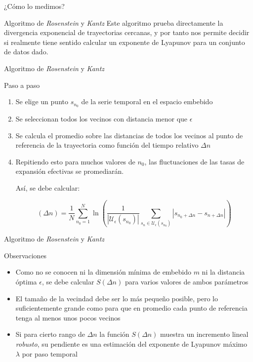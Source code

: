 \documentclass[11pt]{beamer}
\begin{document}
\begin{frame}{¿Cómo lo medimos?}
	\begin{block}{Algoritmo de \textit{Rosenstein} y \textit{Kantz}}
		Este algoritmo prueba directamente la divergencia exponencial de trayectorias cercanas, y por tanto nos permite decidir si realmente tiene sentido calcular un exponente de Lyapunov para un conjunto de datos dado.
	\end{block}
\end{frame}

\begin{frame}{Algoritmo de \textit{Rosenstein} y \textit{Kantz}}
	\small
	\begin{block}{Paso a paso}
		\begin{enumerate}
			\item Se elige un punto $s_{n_0}$ de la serie temporal en el espacio embebido 
			\item Se seleccionan todos los vecinos con distancia menor que $\epsilon$
			\item Se calcula el promedio sobre las distancias de todos los vecinos al punto de referencia de la trayectoria como función del tiempo relativo $\Delta n$
			\item Repitiendo esto para muchos valores de $n_0$, las fluctuaciones de las tasas de expansión efectivas se promediarán.
		\medskip
				
		Así, se debe calcular:

		\begin{equation}
			(\Delta n) = \frac{1}{N} \sum_{n_0=1}^{N} \ln \left( \frac{1}{|\mathcal{U}_\epsilon(s_{n_0})|} \sum_{s_n \in \mathcal{U}_\epsilon(s_{n_0})} |s_{n_0+\Delta n} - s_{n+\Delta n}| \right)
		\end{equation}
		\end{enumerate}
	\end{block}

\end{frame}

\begin{frame}{Algoritmo de \textit{Rosenstein} y \textit{Kantz}}
	\begin{block}{Observaciones}
		\begin{itemize}
			\item Como no se conocen ni la dimensión mínima de embebido $m$ ni la distancia óptima $\epsilon$, se debe calcular $S(\Delta n)$ para varios valores de ambos parámetros
			\item El tamaño de la vecindad debe ser lo más pequeño posible, pero lo suficientemente grande como para que en promedio cada punto de referencia tenga al menos unos pocos vecinos
			\item Si para cierto rango de $\Delta n$ la función $S(\Delta n)$ muestra un incremento lineal \textit{robusto}, su pendiente es una estimación del exponente de Lyapunov máximo $\lambda$ por paso temporal
		\end{itemize}
	\end{block}

\end{frame}
\end{document}
